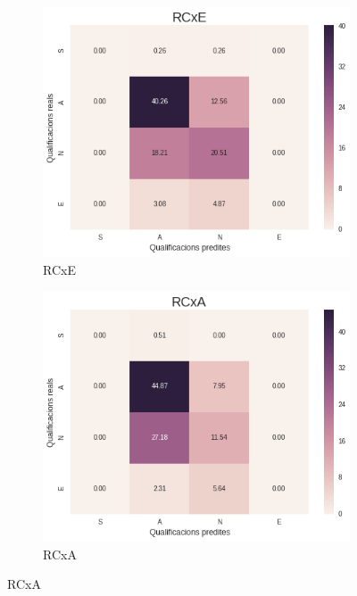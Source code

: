 \documentclass[12pt,a4paper,catalan]{article}
\begin{document}
\begin{figure}[h]
\centering
\begin{subfigure}{.48\textwidth}
  \centering
  \includegraphics[width=\linewidth]{img/heatmap_rcxe_primer_segon.png}
  \caption{RCxE}
\end{subfigure}
\begin{subfigure}{.48\textwidth}
  \centering
  \includegraphics[width=\linewidth]{img/heatmap_rcxa_primer_segon.png}
  \caption{RCxA}
\end{subfigure}
\end{figure}
\end{document}
